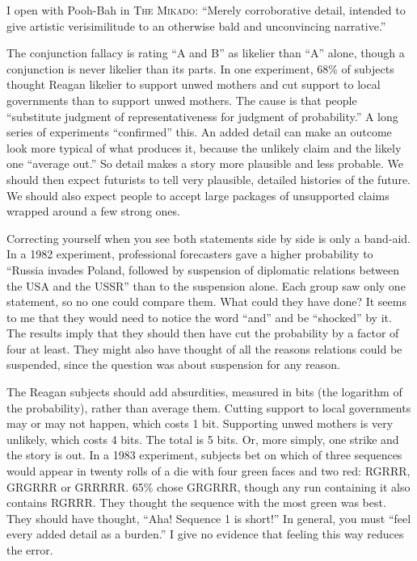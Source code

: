 
I open with Pooh-Bah in \textsc{The Mikado}: ``Merely corroborative detail, intended to give artistic verisimilitude to an otherwise bald and unconvincing narrative.'' 

The conjunction fallacy is rating ``A and B'' as likelier than ``A'' alone, though a conjunction is never likelier than its parts. In one experiment, 68\% of subjects thought Reagan likelier to support unwed mothers and cut support to local governments than to support unwed mothers. The cause is that people ``substitute judgment of representativeness for judgment of probability.'' A long series of experiments ``confirmed'' this. An added detail can make an outcome look more typical of what produces it, because the unlikely claim and the likely one ``average out.'' So detail makes a story more plausible and less probable. We should then expect futurists to tell very plausible, detailed histories of the future. We should also expect people to accept large packages of unsupported claims wrapped around a few strong ones. 

Correcting yourself when you see both statements side by side is only a band-aid. In a 1982 experiment, professional forecasters gave a higher probability to ``Russia invades Poland, followed by suspension of diplomatic relations between the USA and the USSR'' than to the suspension alone. Each group saw only one statement, so no one could compare them. What could they have done? It seems to me that they would need to notice the word ``and'' and be ``shocked'' by it. The results imply that they should then have cut the probability by a factor of four at least. They might also have thought of all the reasons relations could be suspended, since the question was about suspension for any reason.

The Reagan subjects should add absurdities, measured in bits (the logarithm of the probability), rather than average them. Cutting support to local governments may or may not happen, which costs 1 bit. Supporting unwed mothers is very unlikely, which costs 4 bits. The total is 5 bits. Or, more simply, one strike and the story is out.  In a 1983 experiment, subjects bet on which of three sequences would appear in twenty rolls of a die with four green faces and two red: RGRRR, GRGRRR or GRRRRR. 65\% chose GRGRRR, though any run containing it also contains RGRRR. They thought the sequence with the most green was best. They should have thought, ``Aha! Sequence 1 is short!''  In general, you must ``feel every added detail as a burden.'' I give no evidence that feeling this way reduces the error.

